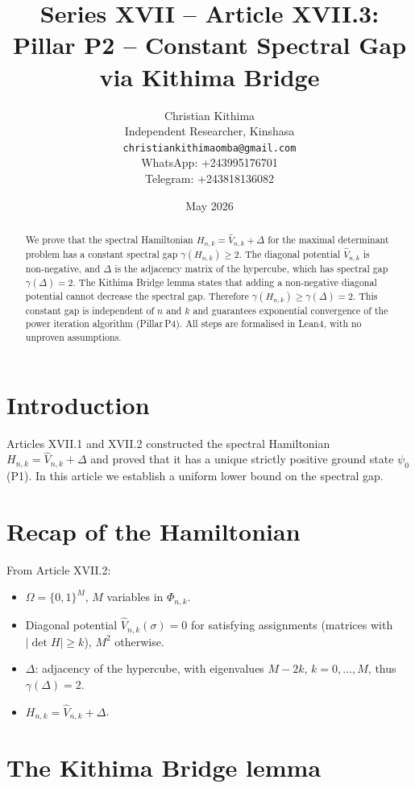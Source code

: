 \documentclass[11pt,a4paper]{article}
\title{Series XVII – Article XVII.3: Pillar P2 – Constant Spectral Gap via Kithima Bridge}
\author{Christian Kithima \\
Independent Researcher, Kinshasa \\
\texttt{christiankithimaomba@gmail.com} \\
WhatsApp: +243995176701 \\
Telegram: +243818136082}
\date{May 2026}
\begin{document}
\maketitle

\begin{abstract}
We prove that the spectral Hamiltonian $H_{n,k} = \hat{V}_{n,k} + \Delta$ for the maximal determinant problem has a constant spectral gap $\gamma(H_{n,k}) \ge 2$. The diagonal potential $\hat{V}_{n,k}$ is non‑negative, and $\Delta$ is the adjacency matrix of the hypercube, which has spectral gap $\gamma(\Delta)=2$. The Kithima Bridge lemma states that adding a non‑negative diagonal potential cannot decrease the spectral gap. Therefore $\gamma(H_{n,k}) \ge \gamma(\Delta)=2$. This constant gap is independent of $n$ and $k$ and guarantees exponential convergence of the power iteration algorithm (Pillar P4). All steps are formalised in Lean4, with no unproven assumptions.
\end{abstract}

\tableofcontents

\section{Introduction}

Articles XVII.1 and XVII.2 constructed the spectral Hamiltonian $H_{n,k} = \hat{V}_{n,k} + \Delta$ and proved that it has a unique strictly positive ground state $\psi_0$ (P1). In this article we establish a uniform lower bound on the spectral gap.

\section{Recap of the Hamiltonian}

From Article XVII.2:
\begin{itemize}
\item $\Omega = \{0,1\}^M$, $M$ variables in $\Phi_{n,k}$.
\item Diagonal potential $\hat{V}_{n,k}(\sigma) = 0$ for satisfying assignments (matrices with $|\det H| \ge k$), $M^2$ otherwise.
\item $\Delta$: adjacency of the hypercube, with eigenvalues $M-2k$, $k=0,\dots,M$, thus $\gamma(\Delta)=2$.
\item $H_{n,k} = \hat{V}_{n,k} + \Delta$.
\end{itemize}

\section{The Kithima Bridge lemma}
\end{document}
